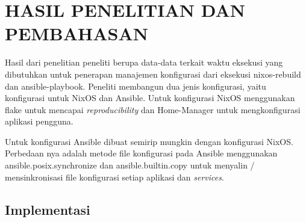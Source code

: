 \documentclass[10pt,twoside]{report}
\begin{document}
\chapter{HASIL PENELITIAN DAN PEMBAHASAN}
Hasil dari penelitian peneliti berupa data-data terkait waktu eksekusi yang
dibutuhkan untuk penerapan manajemen konfigurasi dari eksekusi nixos-rebuild
dan ansible-playbook. Peneliti membangun dua jenis konfigurasi, yaitu
konfigurasi untuk NixOS dan Ansible. Untuk konfigurasi NixOS menggunakan flake
untuk mencapai \textit{reproducibility} dan Home-Manager untuk mengkonfigurasi
aplikasi pengguna.

Untuk konfigurasi Ansible dibuat semirip mungkin dengan konfigurasi NixOS.
Perbedaan nya adalah metode file konfigurasi pada Ansible menggunakan
ansible.posix.synchronize dan ansible.builtin.copy untuk menyalin /
mensinkronisasi file konfigurasi setiap aplikasi dan \textit{services}.
\vspace{3mm}
\section{Implementasi}
\end{document}
